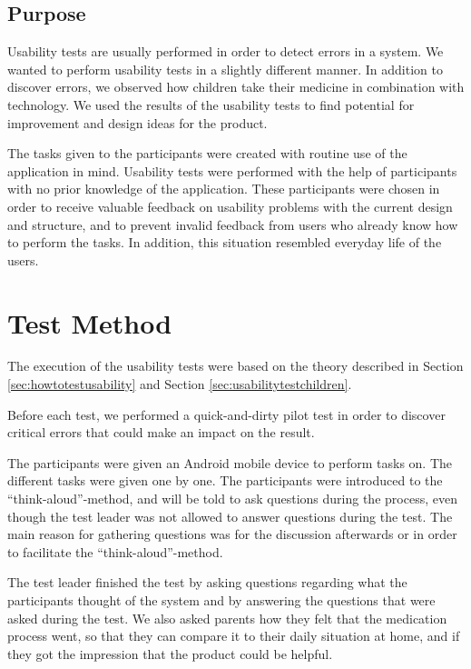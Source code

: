 
\subsection{Purpose}
\label{sec:usabilitypurpose}
Usability tests are usually performed in order to detect errors in a system. We wanted to perform usability tests in a slightly different manner. In addition to discover errors, we observed how children take their medicine in combination with technology. We used the results of the usability tests to find potential for improvement and design ideas for  the product.
 
The tasks given to the participants were created with routine use of the application in mind. Usability tests were performed with the help of participants with no prior knowledge of the application. These participants were chosen in order to receive valuable feedback on usability problems with the current design and structure, and to prevent invalid feedback from users who already know how to perform the tasks. In addition, this situation resembled everyday life of the users.

\section{Test Method}
\label{sec:testmethod}
The execution of the usability tests were based on the theory described in Section \ref{sec:howtotestusability} and Section \ref{sec:usabilitytestchildren}.

Before each test, we performed a quick-and-dirty pilot test in order to discover critical errors that could make an impact on the result.

The participants were given an Android mobile device to perform tasks on. The different tasks were given one by one. The participants were introduced to the ``think-aloud''-method, and will be told to ask questions during the process, even though the test leader was not allowed to answer questions during the test. The main reason for gathering questions was for the discussion afterwards or in order to facilitate the ``think-aloud''-method. 

The test leader finished the test by asking questions regarding what the participants thought of the system and by answering the questions that were asked during the test. We also asked parents how they felt that the medication process went, so that they can compare it to their daily situation at home, and if they got the impression that the product could be helpful.  

